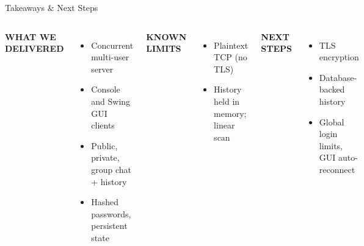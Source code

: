 \documentclass[aspectratio=169,11pt]{beamer}
\newcommand{\kicker}[1]{{\color{amber}\bfseries\scriptsize\MakeUppercase{#1}}}
\begin{document}
\begin{frame}[t]{Takeaways \& Next Steps}
  \vspace{1mm}
  \begin{columns}[T]
    \kicker{What we delivered}
    \begin{itemize}\footnotesize\setlength\itemsep{3pt}
      \item Concurrent multi-user server
      \item Console and Swing GUI clients
      \item Public, private, group chat + history
      \item Hashed passwords, persistent state
    \end{itemize}
    \kicker{Known limits}
    \begin{itemize}\footnotesize\setlength\itemsep{2pt}
      \item Plaintext TCP (no TLS)
      \item History held in memory; linear scan
    \end{itemize}
    \vspace{1mm}
    \kicker{Next steps}
    \begin{itemize}\footnotesize\setlength\itemsep{2pt}
      \item TLS encryption
      \item Database-backed history
      \item Global login limits, GUI auto-reconnect
    \end{itemize}
  \end{columns}
  \vspace{2mm}
\end{frame}
\end{document}
